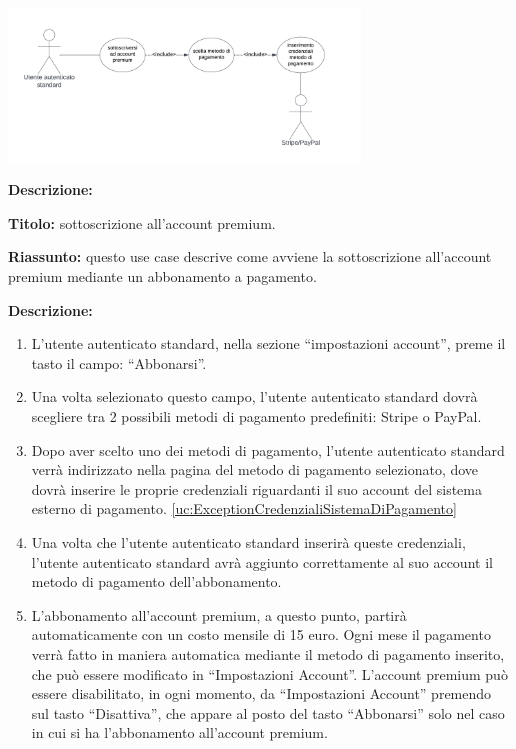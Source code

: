 \begin{listaPersonale}[UC]{}
    \newpage


    \begin{center}
        \includegraphics[width=0.7\textwidth]{img/Diagrammi/UseCases/UtentePremium.png}
    \end{center}

    \textbf{Descrizione:}

    \textbf{Titolo:} sottoscrizione all'account premium.

    \textbf{Riassunto:} questo use case descrive come avviene la sottoscrizione all'account premium mediante un abbonamento a pagamento.

    \textbf{Descrizione:}
    \begin{enumerate}
        \item L'utente autenticato standard, nella sezione “impostazioni account”, preme il tasto il campo: “Abbonarsi”.
        \item Una volta selezionato questo campo, l'utente autenticato standard dovrà scegliere tra 2 possibili metodi di pagamento predefiniti: Stripe o PayPal.
        \item Dopo aver scelto uno dei metodi di pagamento, l'utente autenticato standard verrà indirizzato nella pagina del metodo di pagamento selezionato, dove dovrà inserire le proprie credenziali riguardanti il suo account del sistema esterno di pagamento. \ref{uc:ExceptionCredenzialiSistemaDiPagamento}
        \item Una volta che l'utente autenticato standard inserirà queste credenziali, l'utente autenticato standard avrà aggiunto correttamente al suo account il metodo di pagamento dell'abbonamento.
        \item L'abbonamento all'account premium, a questo punto, partirà automaticamente con un costo mensile di 15 euro. Ogni mese il pagamento verrà fatto in maniera automatica mediante il metodo di pagamento inserito, che può essere modificato in “Impostazioni Account”. L'account premium può essere disabilitato, in ogni momento, da “Impostazioni Account” premendo sul tasto “Disattiva”, che appare al posto del tasto “Abbonarsi” solo nel caso in cui si ha l'abbonamento all'account premium.
    \end{enumerate}


\end{listaPersonale}
